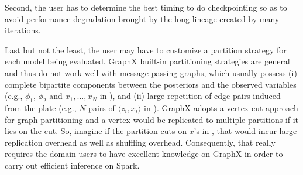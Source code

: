 
%
%
%
%


Second, the user has to determine the best timing to do checkpointing so as to
avoid performance degradation brought by the long lineage created by many iterations.


Last but not the least, the user may have to customize a partition strategy for
each model being evaluated. 
GraphX built-in partitioning strategies are general and thus do not work well with message passing graphs,
which usually 
possess (i) complete bipartite components between the posteriors and the  observed variables
(e.g., $\phi_1$, $\phi_2$ and $x_1, \ldots, x_N$ in ), and
(ii) large repetition of edge pairs induced from the plate (e.g.,  $N$ pairs of $\langle z_i, x_i\rangle$ in ).
GraphX adopts a vertex-cut approach for graph partitioning
and a vertex would be replicated to multiple partitions if it lies on the cut.
So, imagine if the partition cuts on $x$'s in , 
that would incur large replication overhead as well as shuffling overhead.
Consequently, that really requires the domain users 
to have excellent knowledge on GraphX in order to carry out efficient inference on Spark. 


